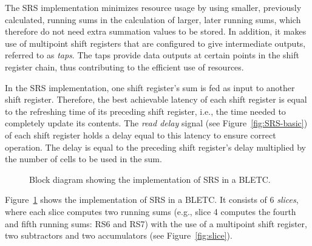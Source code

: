 \documentclass{llncs}
\begin{document}
The SRS implementation minimizes resource usage by using smaller, previously calculated, running sums in the calculation of larger, later running sums, which therefore do not need extra summation values to be stored.
In addition, it makes use of multipoint shift registers that are configured to give intermediate outputs, referred to as \emph{taps}.
The taps provide data outputs at certain points in the shift register chain, thus contributing to the efficient use of resources.

In the SRS implementation, one shift register's sum is fed as input to another shift register.
Therefore, the best achievable latency of each shift register is equal to the refreshing time of its preceding shift register, i.e., the time needed to completely update its contents.
The \emph{read delay} signal (see Figure~\ref{fig:SRS-basic}) of each shift register holds a delay equal to this latency to ensure correct operation.
The delay is equal to the preceding shift register's delay multiplied by the number of cells to be used in the sum.

\begin{figure}[t]
  \centering {}
   \caption{Block diagram showing the implementation of SRS in a BLETC.}
  \label{fig:srs}
\end{figure}

Figure~\ref{fig:srs} shows the implementation of SRS in a BLETC.
It consists of 6 \emph{slices}, where each slice computes two running sums (e.g., slice 4 computes the fourth and fifth running sums: RS6 and RS7) with the use of a multipoint shift register, two subtractors and two accumulators (see Figure~\ref{fig:slice}).
\end{document}
